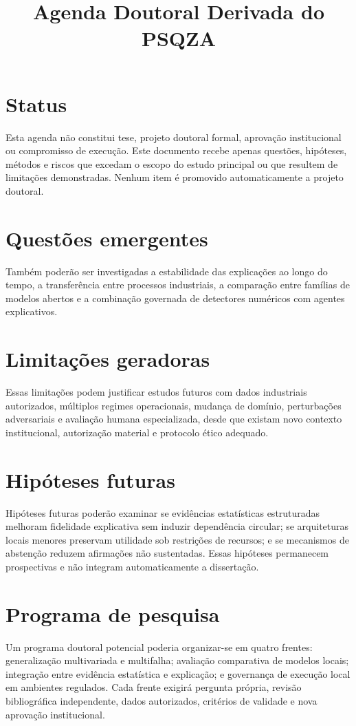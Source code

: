 \documentclass[a4paper,12pt]{article}
\title{Agenda Doutoral Derivada do PSQZA}
\author{\researchauthor}
\date{\researchyear}
\begin{document}
\maketitle

\section{Status}
\DoctoralAgendaScopePT

Esta agenda não constitui tese, projeto doutoral formal, aprovação institucional ou compromisso de execução. Este documento recebe apenas questões, hipóteses, métodos e riscos que excedam o escopo do estudo principal ou que resultem de limitações demonstradas. Nenhum item é promovido automaticamente a projeto doutoral.

\section{Questões emergentes}
\DoctoralFutureQuestionsPT

Também poderão ser investigadas a estabilidade das explicações ao longo do tempo, a transferência entre processos industriais, a comparação entre famílias de modelos abertos e a combinação governada de detectores numéricos com agentes explicativos.

\section{Limitações geradoras}
\ResearchLimitationsPT

Essas limitações podem justificar estudos futuros com dados industriais autorizados, múltiplos regimes operacionais, mudança de domínio, perturbações adversariais e avaliação humana especializada, desde que existam novo contexto institucional, autorização material e protocolo ético adequado.

\section{Hipóteses futuras}
Hipóteses futuras poderão examinar se evidências estatísticas estruturadas melhoram fidelidade explicativa sem induzir dependência circular; se arquiteturas locais menores preservam utilidade sob restrições de recursos; e se mecanismos de abstenção reduzem afirmações não sustentadas. Essas hipóteses permanecem prospectivas e não integram automaticamente a dissertação.

\section{Programa de pesquisa}
Um programa doutoral potencial poderia organizar-se em quatro frentes: generalização multivariada e multifalha; avaliação comparativa de modelos locais; integração entre evidência estatística e explicação; e governança de execução local em ambientes regulados. Cada frente exigirá pergunta própria, revisão bibliográfica independente, dados autorizados, critérios de validade e nova aprovação institucional.

\printbibliography
\end{document}
